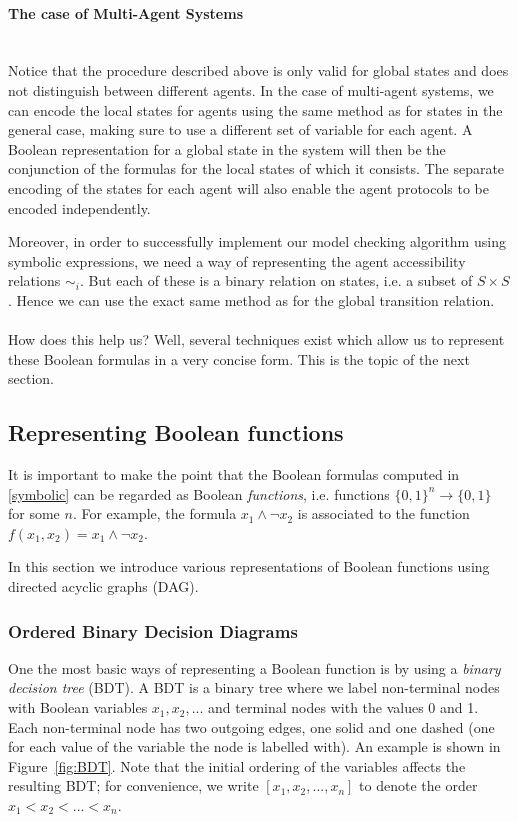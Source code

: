 \documentclass[11pt]{article}
\newcommand{\myparagraph}[1]{\paragraph{#1}\mbox{}\\}
\begin{document}
\myparagraph{The case of Multi-Agent Systems}

Notice that the procedure described above is only valid for global states and does not distinguish between different agents. 
In the case of multi-agent systems, we can encode the local states for agents using the same method as for states in the general case, making sure to use a different set of variable for each agent. A Boolean representation for a global state in the system will then be the conjunction of the formulas for the local states of which it consists. The separate encoding of the states for each agent will also enable the agent protocols to be encoded independently.

Moreover, in order to successfully implement our model checking algorithm using symbolic expressions, we need a way of representing the agent accessibility relations $\sim_i$.
But each of these is a binary relation on states, i.e. a subset of $S \times S$. Hence we can use the exact same method as for the global transition relation. 
\\\\

How does this help us? Well, several techniques exist which allow us to represent these Boolean formulas in a very concise form. This is the topic of the next section.

\subsection{Representing Boolean functions}

It is important to make the point that the Boolean formulas computed in \ref{symbolic} can be regarded as Boolean \textit{functions}, i.e. functions $\{0, 1\}^n \rightarrow \{0, 1\}$ for some $n$. For example, the formula $x_1 \land \lnot x_2$ is associated to the function $f(x_1, x_2) = x_1 \land \lnot x_2$.

In this section we introduce various representations of Boolean functions using directed acyclic graphs (DAG). 

\subsubsection{Ordered Binary Decision Diagrams}

One the most basic ways of representing a Boolean function is by using a \textit{binary decision tree} (BDT). A BDT is a binary tree where we label non-terminal nodes with Boolean variables $x_1, x_2, ...$ and terminal nodes with the values 0 and 1. Each non-terminal node has two outgoing edges, one solid and one dashed (one for each value of the variable the node is labelled with). An example is shown in Figure~\ref{fig:BDT}. Note that the initial ordering of the variables affects the resulting BDT; for convenience, we write $[x_1, x_2, ..., x_n]$ to denote the order $x_1 < x_2 < ... < x_n$.
\end{document}
